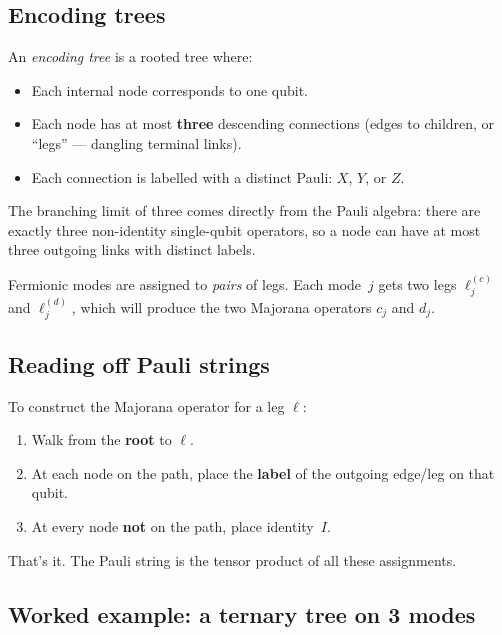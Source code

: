 \documentclass[11pt,a4paper]{article}
\theoremstyle{definition}
\begin{document}
\subsection{Encoding trees}

An \emph{encoding tree} is a rooted tree where:
\begin{itemize}
  \item Each internal node corresponds to one qubit.
  \item Each node has at most \textbf{three} descending connections
    (edges to children, or ``legs'' --- dangling terminal links).
  \item Each connection is labelled with a distinct Pauli:
    $X$, $Y$, or $Z$.
\end{itemize}

The branching limit of three comes directly from the Pauli algebra:
there are exactly three non-identity single-qubit operators, so a
node can have at most three outgoing links with distinct labels.

Fermionic modes are assigned to \emph{pairs} of legs.  Each mode~$j$
gets two legs $\ell_j^{(c)}$ and $\ell_j^{(d)}$, which will produce
the two Majorana operators $c_j$ and $d_j$.

\subsection{Reading off Pauli strings}

To construct the Majorana operator for a leg $\ell$:
\begin{enumerate}
  \item Walk from the \textbf{root} to $\ell$.
  \item At each node on the path, place the \textbf{label} of the
    outgoing edge/leg on that qubit.
  \item At every node \textbf{not} on the path, place identity~$I$.
\end{enumerate}

That's it.  The Pauli string is the tensor product of all these
assignments.

\subsection{Worked example: a ternary tree on 3 modes}
\end{document}
